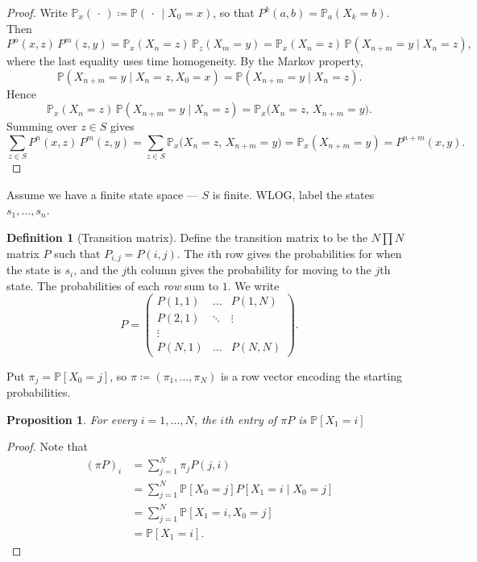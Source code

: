 \documentclass{tufte-handout}
\renewcommand*\P{\mathbb{P}}
\newtheorem{prop}[thm]{Proposition}
\theoremstyle{definition}
\newtheorem{defn}[thm]{Definition}
\begin{document}
\begin{proof}
Write $\mathbb{P}_x(\,\cdot\,)\coloneqq\mathbb{P}(\,\cdot\,\mid X_0=x)$, so that
$P^{k}(a,b)=\mathbb{P}_a(X_k=b)$. Then
\[
P^{n}(x,z)\,P^{m}(z,y)
= \mathbb{P}_x(X_n=z)\,\mathbb{P}_z(X_m=y)
= \mathbb{P}_x(X_n=z)\,\mathbb{P}(X_{n+m}=y\mid X_n=z),
\]
where the last equality uses time homogeneity. By the Markov property,
\[
\mathbb{P}(X_{n+m}=y\mid X_n=z,X_0=x)=\mathbb{P}(X_{n+m}=y\mid X_n=z).
\]
Hence
\[
\mathbb{P}_x(X_n=z)\,\mathbb{P}(X_{n+m}=y\mid X_n=z)
= \mathbb{P}_x\big(X_n=z,\,X_{n+m}=y\big).
\]
Summing over $z\in S$ gives
\[
\sum_{z\in S} P^{n}(x,z)\,P^{m}(z,y)
= \sum_{z\in S} \mathbb{P}_x\big(X_n=z,\,X_{n+m}=y\big)
= \mathbb{P}_x(X_{n+m}=y)
= P^{n+m}(x,y).
\]
\end{proof}
Assume we have a finite state space --- $S$ is finite. WLOG, label the states $s_1,\ldots,s_n$.

\begin{defn}[Transition matrix]
	Define the transition matrix to be the $N \prod N$ matrix $P$ such that $P_{i,j} = P(i,j)$. The $i$th row gives the probabilities for when the state is $s_i$, and the $j$th column gives the probability for moving to the $j$th state. The probabilities of each \emph{row} sum to $1$. We write \[
		P = \begin{pmatrix}
			P(1,1) & \ldots & P(1,N) \\
			P(2,1) & \ddots & \vdots \\
			\vdots & & \\
			P(N,1) & \ldots & P(N,N)
		\end{pmatrix} 
	.\] 

	Put $\pi_j = \P\left[ X_0 = j \right]$, so $\pi \coloneqq \left( \pi_1,\ldots,\pi_N \right)$ is a row vector encoding the starting probabilities.
\end{defn}

\begin{prop}
	For every $i = 1,\ldots,N$, the $i$th entry of $\pi P$ is $\P\left[ X_1 = i \right]$
\end{prop}

\begin{proof}
	Note that 
	\begin{align*}
		\left( \pi P \right)_i &= \sum\limits_{j=1}^{N} \pi_j P(j,i) \\
							   &= \sum\limits_{j=1}^{N} \P[X_0=j] P[X_1 = i \mid X_0 = j] \\
							   &= \sum\limits_{j=1}^{N} \P\left[ X_1 = i, X_0 = j \right]  \\
							   &= \P\left[ X_1= i \right] 
	.\end{align*}
\end{proof}
\end{document}

